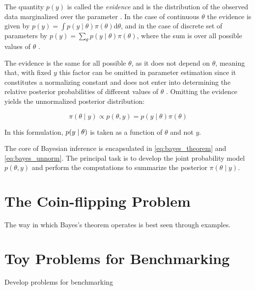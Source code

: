 The quantity $p(y)$ is called the \textit{evidence} and is the distribution of the observed data marginalized over the parameter \cite{ABCprimer}. In the case of continuous $\theta$ the evidence is given by $p(y) = \int p(y \mid \theta) \pi(\theta) \mathrm{d}\theta$, and in the case of discrete set of parameters by $p(y) = \sum_\theta p(y\mid \theta) \pi(\theta)$, where the sum is over all possible values of $\theta$ \cite[p. 7]{BDA}. 

The evidence is the same for all possible $\theta$, as it does not depend on $\theta$, meaning that, with fixed $y$ this factor can be omitted in parameter estimation since it constitutes a normalizing constant and does not enter into determining the relative posterior probabilities of different values of $\theta$ \cite{ABCprimer}. Omitting the evidence yields the unnormalized posterior distribution: 

\begin{equation}\label{eq:bayes_unnorm}
    \pi (\theta \mid y) \propto p(\theta, y) =  p (y \mid \theta) \pi (\theta)
\end{equation}

In this formulation, $p \qty(y \mid \theta)$ is taken as a function of $\theta$ and not $y$.  

The core of Bayesian inference is encapsulated in \autoref{eq:bayes_theorem} and \autoref{eq:bayes_unnorm}. The principal task is to develop the joint probability model $p(\theta, y)$ and perform the computations to summarize the posterior $\pi(\theta \mid y)$.


\section{The Coin-flipping Problem}\label{sec:coin_flipping}

The way in which Bayes’s theorem operates is best seen through examples. 


\section{Toy Problems for Benchmarking}\label{sec:toy_problems}

Develop problems for benchmarking

